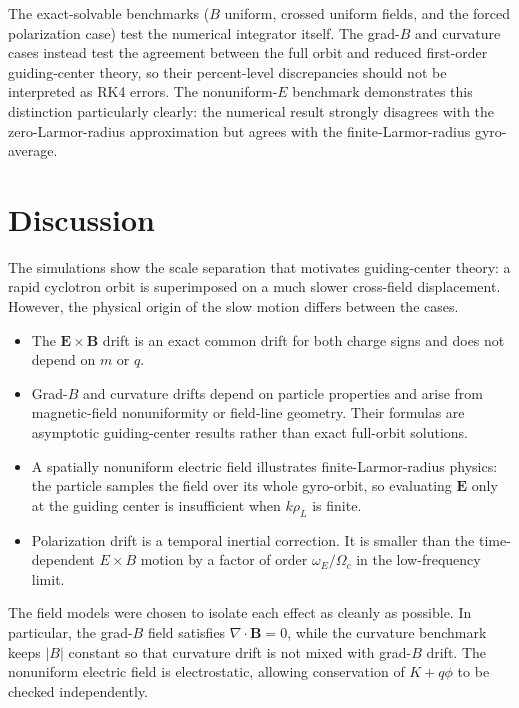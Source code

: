 \documentclass[11pt,a4paper]{article}
\newcommand{\vect}[1]{\boldsymbol{#1}}
\newcommand{\Ohm}{\Omega_c}
\newcommand{\rhL}{\rho_L}
\begin{document}
The exact-solvable benchmarks ($B$ uniform, crossed uniform fields, and the forced polarization case) test the numerical integrator itself. The grad-$B$ and curvature cases instead test the agreement between the full orbit and reduced first-order guiding-center theory, so their percent-level discrepancies should not be interpreted as RK4 errors. The nonuniform-$E$ benchmark demonstrates this distinction particularly clearly: the numerical result strongly disagrees with the zero-Larmor-radius approximation but agrees with the finite-Larmor-radius gyro-average.

\section{Discussion}

The simulations show the scale separation that motivates guiding-center theory: a rapid cyclotron orbit is superimposed on a much slower cross-field displacement. However, the physical origin of the slow motion differs between the cases.

\begin{itemize}
    \item The $\vect{E}\times\vect{B}$ drift is an exact common drift for both charge signs and does not depend on $m$ or $q$.
    \item Grad-$B$ and curvature drifts depend on particle properties and arise from magnetic-field nonuniformity or field-line geometry. Their formulas are asymptotic guiding-center results rather than exact full-orbit solutions.
    \item A spatially nonuniform electric field illustrates finite-Larmor-radius physics: the particle samples the field over its whole gyro-orbit, so evaluating $\vect{E}$ only at the guiding center is insufficient when $k\rhL$ is finite.
    \item Polarization drift is a temporal inertial correction. It is smaller than the time-dependent $E\times B$ motion by a factor of order $\omega_E/\Ohm$ in the low-frequency limit.
\end{itemize}

The field models were chosen to isolate each effect as cleanly as possible. In particular, the grad-$B$ field satisfies $\nabla\cdot\vect{B}=0$, while the curvature benchmark keeps $|B|$ constant so that curvature drift is not mixed with grad-$B$ drift. The nonuniform electric field is electrostatic, allowing conservation of $K+q\phi$ to be checked independently.
\end{document}
